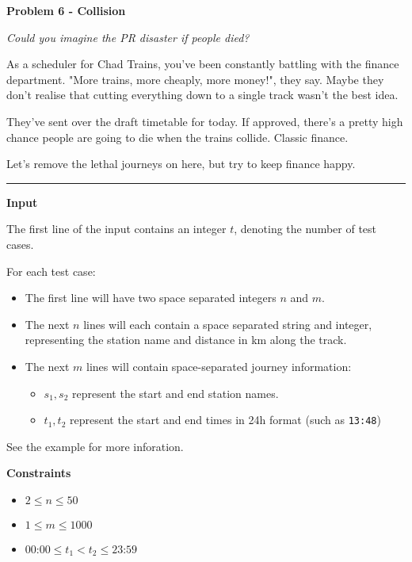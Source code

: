 \LARGE \textbf{Problem 6 - Collision} \normalsize

{\itshape Could you imagine the PR disaster if people died?}

As a scheduler for Chad Trains, you've been constantly battling with the finance department. 
"More trains, more cheaply, more money!", they say. 
Maybe they don't realise that cutting everything down to a single track wasn't the best idea.

They've sent over the draft timetable for today. 
If approved, there's a pretty high chance people are going to die when the trains collide.
Classic finance.

Let's remove the lethal journeys on here, but try to keep finance happy.

\vspace{8pt}
\hrule

\textbf{Input}

The first line of the input contains an integer $t$, denoting the number of test cases.

For each test case:

\begin{itemize}
    \item The first line will have two space separated integers $n$ and $m$.
    \item The next $n$ lines will each contain a space separated string and integer, 
    \\ representing the station name and distance in km along the track.
    \item The next $m$ lines will contain space-separated journey information: 
    \begin{itemize}
        \item $s_1, s_2$ represent the start and end station names.
        \item $t_1, t_2$ represent the start and end times in 24h format (such as \texttt{13:48})
    \end{itemize}
\end{itemize}

See the example for more inforation.

\textbf{Constraints}

\begin{itemize}
    \item $2 \leq n \leq 50$
    \item $1 \leq m \leq 1000$
    \item $00\text{:}00 \leq t_1 < t_2 \leq 23\text{:}59$  
\end{itemize}

